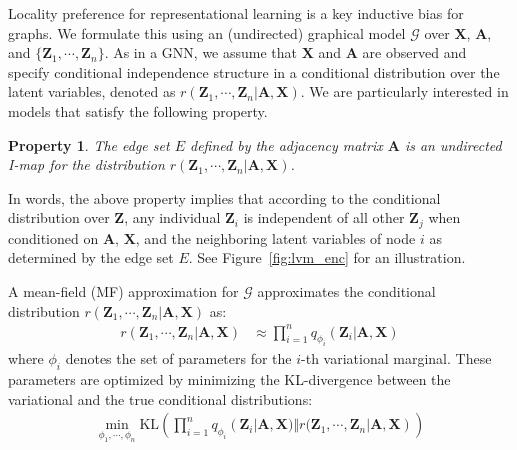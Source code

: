 \documentclass{article}
\newtheorem{property}[theorem]{Property}
\begin{document}
Locality preference for representational learning is a key inductive bias for graphs. We formulate this using an (undirected) graphical model $\mathcal{G}$ over $\mathbf{X}$,  $\mathbf{A}$, and $\{\mathbf{Z}_1, \cdots, \mathbf{Z}_n\}$.
As in a GNN, we assume that $\mathbf{X}$ and $\mathbf{A}$ are observed and specify conditional independence structure in 
a
conditional distribution over the latent variables, denoted as $r(\mathbf{Z}_1, \cdots, \mathbf{Z}_n \vert \mathbf{A}, \mathbf{X})$. We are particularly interested in models that satisfy the following property.
\begin{property}\label{thm:imap}
The edge set $E$ defined by the adjacency matrix  $\mathbf{A}$ is an undirected I-map for the 
distribution $r(\mathbf{Z}_1, \cdots, \mathbf{Z}_n \vert \mathbf{A}, \mathbf{X})$.
\end{property}

In words, the above property implies that according to the conditional distribution over $\mathbf{Z}$, any individual  $\mathbf{Z}_i$ is independent of all other $\mathbf{Z}_j$ 
when conditioned on $\mathbf{A}$, $\mathbf{X}$, and the neighboring latent variables of node $i$ as determined by the edge set $E$. See Figure~\ref{fig:lvm_enc} for an illustration. 

A mean-field (MF) approximation for $\mathcal{G}$  approximates the conditional distribution  $r(\mathbf{Z}_1, \cdots, \mathbf{Z}_n \vert \mathbf{A}, \mathbf{X})$ as:
\begin{align}\label{eq:enc_gnn_mf}
r(\mathbf{Z}_1, \cdots, \mathbf{Z}_n \vert \mathbf{A}, \mathbf{X}) &\approx \prod_{i=1}^n q_{\phi_i}(\mathbf{Z}_i \vert \mathbf{A}, \mathbf{X})
\end{align}
where $\phi_i$ denotes the set of parameters for the $i$-th variational 
marginal.
These parameters are optimized by minimizing the KL-divergence between the variational 
and the true 
conditional distributions:
\begin{align}\label{eq:lvm_inf_enc}
\min_{\phi_1,\cdots,\phi_n} \mathrm{KL}\left(\prod_{i=1}^n q_{\phi_i}\left(\mathbf{Z}_i \vert \mathbf{A}, \mathbf{X}) \Vert r(\mathbf{Z}_1, \cdots, \mathbf{Z}_n \vert \mathbf{A}, \mathbf{X}\right)\right)
\end{align}
\end{document}
